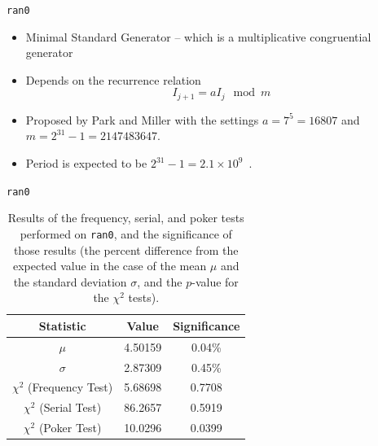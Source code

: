 \documentclass{beamer} %
\begin{document}
\begin{frame}{\texttt{ran0}}
\begin{itemize}
\item Minimal Standard Generator -- which is a multiplicative congruential generator~\cite{recipes}
\item Depends on the recurrence relation
\begin{equation}
\label{eq:ran0recur}
I_{j+1}=aI_{j}\mod m
\end{equation}
\item Proposed by Park and Miller with the settings $a=7^{5}=16807$ and $m=2^{31}-1=2147483647$.  
\item Period is expected to be $2^{31}-1=2.1\times10^{9}$~\cite{recipes}.  
\end{itemize}
\end{frame}

\begin{frame}{\texttt{ran0}}
\begin{table}[ht]
\begin{center}
\begin{tabular}{c|c|c} \hline
Statistic & Value & Significance\\\hline
$\mu$ & 4.50159 & 0.04\% \\
$\sigma$ & 2.87309 & 0.45\%\\
$\chi^{2}$ (Frequency Test) & 5.68698 & 0.7708 \\
$\chi^{2}$ (Serial Test) & 86.2657 & 0.5919 \\
$\chi^{2}$ (Poker Test) & 10.0296 & 0.0399 \\ \hline
\end{tabular}
\caption{Results of the frequency, serial, and poker tests performed on \texttt{ran0}, and the significance of those results (the percent difference from the expected value in the case of the mean $\mu$ and the standard deviation $\sigma$, and the $p$-value for the $\chi^{2}$ tests).}
\label{tab:ran0results}
\end{center}
\end{table}
\end{frame}
\end{document}
